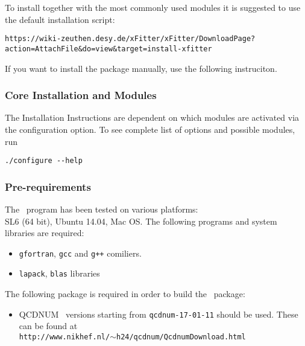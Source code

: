 
\label{sec:install}

To install {\fitter} together with the most commonly used modules it is suggested to use the default installation script:

{\scriptsize
{\tt https://wiki-zeuthen.desy.de/xFitter/xFitter/DownloadPage?action=AttachFile\&do=view\&target=install-xfitter}
}

If you want to install the package manually, use the following instruciton.

\subsubsection{Core Installation and Modules}
The Installation Instructions are dependent on which modules are activated via the configuration option. To see complete list of options and possible
modules, run
\begin{verbatim}
./configure --help
\end{verbatim}
\subsubsection{Pre-requirements}

The \fitter\ program has been tested on various platforms:\\
 SL6 (64 bit),  Ubuntu 14.04, Mac OS.  The following programs and system libraries are required:
\begin{itemize}
 \item {\tt gfortran}, {\tt gcc} and {\tt g++}  comiliers.   
 \item {\tt lapack}, {\tt blas} libraries
\end{itemize}

The following package is required in order to build the \fitter\ package:
\begin{itemize}
\item QCDNUM~\cite{qcdnum} versions starting from {\tt qcdnum-17-01-11} should be used. These can be found at \\
  {\tt http://www.nikhef.nl/$\sim$h24/qcdnum/QcdnumDownload.html}
\end{itemize}

